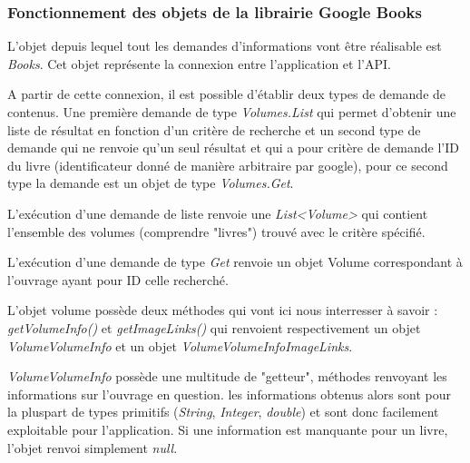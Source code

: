 \subsubsection{Fonctionnement des objets de la librairie Google Books}

L'objet depuis lequel tout les demandes d'informations vont être réalisable est \emph{Books}. Cet objet représente la connexion entre l'application et l'API.

A partir de cette connexion, il est possible d'établir deux types de demande de contenus. Une première demande de type \emph{Volumes.List} qui permet d'obtenir une liste de résultat en fonction d'un critère de recherche et un second type de demande qui ne renvoie qu'un seul résultat et qui a pour critère de demande l'ID du livre (identificateur donné de manière arbitraire par google), pour ce second type la demande est un objet de type \emph{Volumes.Get}.

L'exécution d'une demande de liste renvoie une \emph{List\textless Volume\textgreater} qui contient l'ensemble des volumes (comprendre "livres") trouvé avec le critère spécifié.

L'exécution d'une demande de type \emph{Get} renvoie un objet Volume correspondant à l'ouvrage ayant pour ID celle recherché.

L'objet volume possède deux méthodes qui vont ici nous interresser à savoir : \emph{getVolumeInfo()} et \emph{getImageLinks()} qui renvoient respectivement un objet \emph{VolumeVolumeInfo} et un objet \emph{VolumeVolumeInfoImageLinks}.

\emph{VolumeVolumeInfo} possède une multitude de "getteur", méthodes renvoyant les informations sur l'ouvrage en question. les informations obtenus alors sont pour la pluspart de types primitifs (\emph{String}, \emph{Integer}, \emph{double}) et sont donc facilement exploitable pour l'application. Si une information est manquante pour un livre, l'objet renvoi simplement \emph{null}.

\newpage{}

